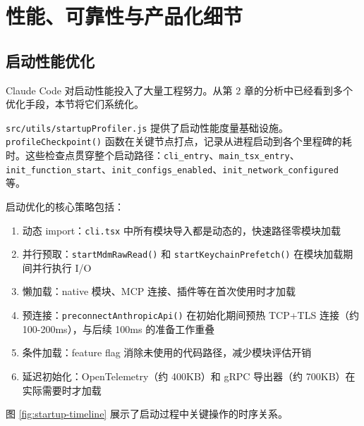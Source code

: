 \chapter{性能、可靠性与产品化细节}

\section{启动性能优化}

Claude Code 对启动性能投入了大量工程努力。从第 2 章的分析中已经看到多个优化手段，本节将它们系统化。

\texttt{src/utils/startupProfiler.js} 提供了启动性能度量基础设施。\texttt{profileCheckpoint()} 函数在关键节点打点，记录从进程启动到各个里程碑的耗时。这些检查点贯穿整个启动路径：\texttt{cli\_entry}、\texttt{main\_tsx\_entry}、\texttt{init\_function\_start}、\texttt{init\_configs\_enabled}、\texttt{init\_network\_configured} 等。

启动优化的核心策略包括：

\begin{enumerate}
  \item 动态 import：\texttt{cli.tsx} 中所有模块导入都是动态的，快速路径零模块加载
  \item 并行预取：\texttt{startMdmRawRead()} 和 \texttt{startKeychainPrefetch()} 在模块加载期间并行执行 I/O
  \item 懒加载：native 模块、MCP 连接、插件等在首次使用时才加载
  \item 预连接：\texttt{preconnectAnthropicApi()} 在初始化期间预热 TCP+TLS 连接（约 100-200ms），与后续 100ms 的准备工作重叠
  \item 条件加载：feature flag 消除未使用的代码路径，减少模块评估开销
  \item 延迟初始化：OpenTelemetry（约 400KB）和 gRPC 导出器（约 700KB）在实际需要时才加载
\end{enumerate}

图 \ref{fig:startup-timeline} 展示了启动过程中关键操作的时序关系。


